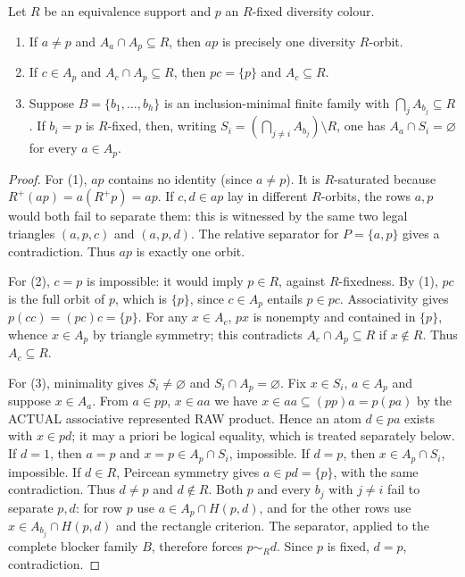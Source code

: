 \begin{lemma}
\label{lem:rh-collapse}
Let $R$ be an equivalence support and $p$ an $R$-fixed diversity colour.
\begin{enumerate}
\item If $a\ne p$ and $A_a\cap A_p\subseteq R$, then $ap$ is precisely
one diversity $R$-orbit.
\item If $c\in A_p$ and $A_c\cap A_p\subseteq R$, then
$p c=\{p\}$ and $A_c\subseteq R$.
\item Suppose $B=\{b_1,\dots,b_h\}$ is an inclusion-minimal finite
family with $\bigcap_jA_{b_j}\subseteq R$. If $b_i=p$ is $R$-fixed,
then, writing $S_i=(\bigcap_{j\ne i}A_{b_j})\setminus R$, one has
$A_a\cap S_i=\varnothing$ for every $a\in A_p$.
\end{enumerate}
\end{lemma}
\begin{proof}
For (1), $ap$ contains no identity (since $a\ne p$). It is
$R$-saturated because $R^+(ap)=a(R^+p)=ap$. If $c,d\in ap$ lay in
different $R$-orbits, the rows $a,p$ would both fail to separate them:
this is witnessed by the same two legal triangles $(a,p,c)$ and
$(a,p,d)$. The relative separator for $P=\{a,p\}$ gives a
contradiction. Thus $ap$ is exactly one orbit.

For (2), $c=p$ is impossible: it would imply $p\in R$, against
$R$-fixedness. By (1), $pc$ is the full orbit of $p$, which is
$\{p\}$, since $c\in A_p$ entails $p\in pc$. Associativity gives
$p(cc)=(pc)c=\{p\}$. For any $x\in A_c$, $px$ is nonempty and
contained in $\{p\}$, whence $x\in A_p$ by triangle symmetry;
this contradicts $A_c\cap A_p\subseteq R$ if $x\notin R$.
Thus $A_c\subseteq R$.

For (3), minimality gives $S_i\ne\varnothing$ and
$S_i\cap A_p=\varnothing$. Fix $x\in S_i$, $a\in A_p$ and suppose
$x\in A_a$. From $a\in pp$, $x\in aa$ we have
$x\in aa\subseteq(pp)a=p(pa)$ by the ACTUAL
associative represented RAW product. Hence an atom
$d\in pa$ exists with $x\in pd$; it may a priori
be logical equality, which is treated separately below. If $d=1$, then $a=p$ and
$x=p\in A_p\cap S_i$, impossible. If $d=p$, then
$x\in A_p\cap S_i$, impossible. If $d\in R$, Peircean symmetry
gives $a\in pd=\{p\}$, with the same contradiction. Thus
$d\ne p$ and $d\notin R$. Both $p$ and every $b_j$ with $j\ne i$
fail to separate $p,d$: for row $p$ use
$a\in A_p\cap H(p,d)$, and for the other rows use
$x\in A_{b_j}\cap H(p,d)$ and the rectangle criterion.
The separator, applied to the complete blocker family $B$, therefore
forces $p\sim_R d$. Since $p$ is fixed, $d=p$, contradiction.
\end{proof}

